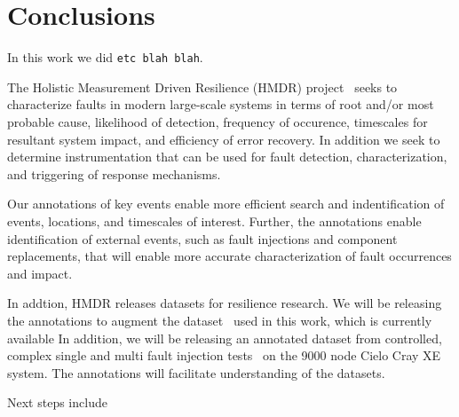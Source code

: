 \section{Conclusions}
\label{s:conclusion}
In this work we did \texttt{etc blah blah}.

The Holistic Measurement Driven Resilience (HMDR) project~\cite{HMDRweb}
seeks to characterize faults in modern large-scale systems
in terms of root and/or most probable cause, likelihood
of detection, frequency of occurence, timescales for
resultant system impact, and efficiency of error recovery.
In addition we seek to determine instrumentation that can be used for
fault detection, characterization, and triggering
of response mechanisms.

Our annotations of key events enable
more efficient search and indentification of
events, locations, and timescales of interest.
Further, the annotations enable identification
of external events, such as fault injections
and component replacements, that will enable
more accurate characterization of fault occurrences
and impact.

In addtion, HMDR releases datasets for resilience research.
We will be releasing the annotations to augment the dataset~\cite{Mutrino3mo} used in this
work, which is currently available
In addition, we will be releasing an annotated dataset from controlled, complex single
and multi fault injection tests~\cite{CieloFICUG2017} on the 9000 node Cielo Cray XE system.
The annotations will facilitate understanding
of the datasets.


Next steps include 





